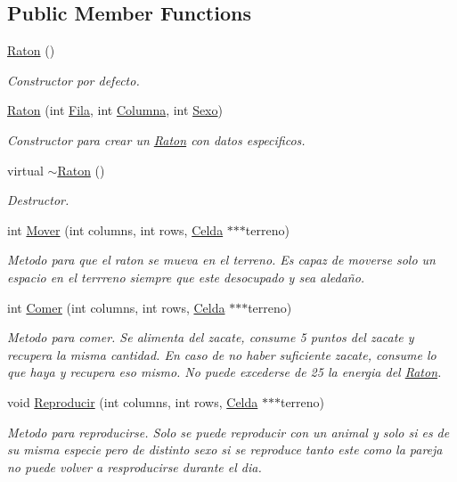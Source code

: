 \subsection*{Public Member Functions}
\begin{DoxyCompactItemize}
\item 
\hyperlink{classRaton_a9981955d139254e7a3990ebbf4d6d6d2}{Raton} ()
\begin{DoxyCompactList}\small\item\em Constructor por defecto. \end{DoxyCompactList}\item 
\hyperlink{classRaton_abd3b46771d6db783f207274aab538783}{Raton} (int \hyperlink{classAnimal_ab403adfd13b57143eff123bdd6a2febb}{Fila}, int \hyperlink{classAnimal_a340d64e6e4ffe5f35e0855c63aad1bd3}{Columna}, int \hyperlink{classAnimal_a42b629ae5a7e0c05263a3f6e592ea116}{Sexo})
\begin{DoxyCompactList}\small\item\em Constructor para crear un \hyperlink{classRaton}{Raton} con datos especificos. \end{DoxyCompactList}\item 
virtual \hyperlink{classRaton_a65e9e02f328adbda8d588548a3b1d76b}{$\sim$\+Raton} ()
\begin{DoxyCompactList}\small\item\em Destructor. \end{DoxyCompactList}\item 
int \hyperlink{classRaton_a0dab97a891533772429b19419d8e727f}{Mover} (int columns, int rows, \hyperlink{classCelda}{Celda} $\ast$$\ast$$\ast$terreno)
\begin{DoxyCompactList}\small\item\em Metodo para que el raton se mueva en el terreno. Es capaz de moverse solo un espacio en el terrreno siempre que este desocupado y sea aledaño. \end{DoxyCompactList}\item 
int \hyperlink{classRaton_aa01334349e5c110c31f32db729d7f4bd}{Comer} (int columns, int rows, \hyperlink{classCelda}{Celda} $\ast$$\ast$$\ast$terreno)
\begin{DoxyCompactList}\small\item\em Metodo para comer. Se alimenta del zacate, consume 5 puntos del zacate y recupera la misma cantidad. En caso de no haber suficiente zacate, consume lo que haya y recupera eso mismo. No puede excederse de 25 la energia del \hyperlink{classRaton}{Raton}. \end{DoxyCompactList}\item 
void \hyperlink{classRaton_a0abb2bfb6f1eda254d4e6f02e2f86861}{Reproducir} (int columns, int rows, \hyperlink{classCelda}{Celda} $\ast$$\ast$$\ast$terreno)
\begin{DoxyCompactList}\small\item\em Metodo para reproducirse. Solo se puede reproducir con un animal y solo si es de su misma especie pero de distinto sexo si se reproduce tanto este como la pareja no puede volver a resproducirse durante el dia. \end{DoxyCompactList}\end{DoxyCompactItemize}
